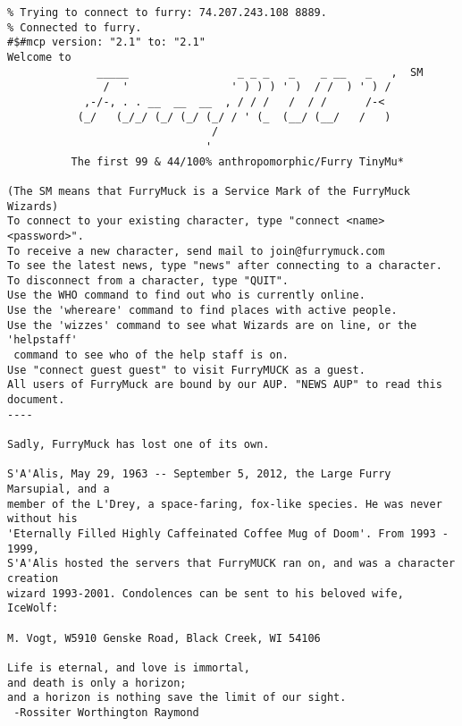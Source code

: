 \begin{verbatim}
% Trying to connect to furry: 74.207.243.108 8889.
% Connected to furry.
#$#mcp version: "2.1" to: "2.1"
Welcome to
              _____                 _ _ _   _    _ __   _   ,  SM
               /  '                ' ) ) ) ' )  / /  ) ' ) /
            ,-/-, . . __  __  __  , / / /   /  / /      /-<
           (_/   (_/_/ (_/ (_/ (_/ / ' (_  (__/ (__/   /   )
                                /
                               '
          The first 99 & 44/100% anthropomorphic/Furry TinyMu*

(The SM means that FurryMuck is a Service Mark of the FurryMuck Wizards)
To connect to your existing character, type "connect <name> <password>".
To receive a new character, send mail to join@furrymuck.com
To see the latest news, type "news" after connecting to a character.
To disconnect from a character, type "QUIT".
Use the WHO command to find out who is currently online.
Use the 'whereare' command to find places with active people.
Use the 'wizzes' command to see what Wizards are on line, or the 'helpstaff'
 command to see who of the help staff is on.
Use "connect guest guest" to visit FurryMUCK as a guest.
All users of FurryMuck are bound by our AUP. "NEWS AUP" to read this document.
----

Sadly, FurryMuck has lost one of its own.

S'A'Alis, May 29, 1963 -- September 5, 2012, the Large Furry Marsupial, and a
member of the L'Drey, a space-faring, fox-like species. He was never without his
'Eternally Filled Highly Caffeinated Coffee Mug of Doom'. From 1993 - 1999,
S'A'Alis hosted the servers that FurryMUCK ran on, and was a character creation
wizard 1993-2001. Condolences can be sent to his beloved wife, IceWolf:

M. Vogt, W5910 Genske Road, Black Creek, WI 54106

Life is eternal, and love is immortal,
and death is only a horizon;
and a horizon is nothing save the limit of our sight.
 -Rossiter Worthington Raymond


\end{verbatim}
